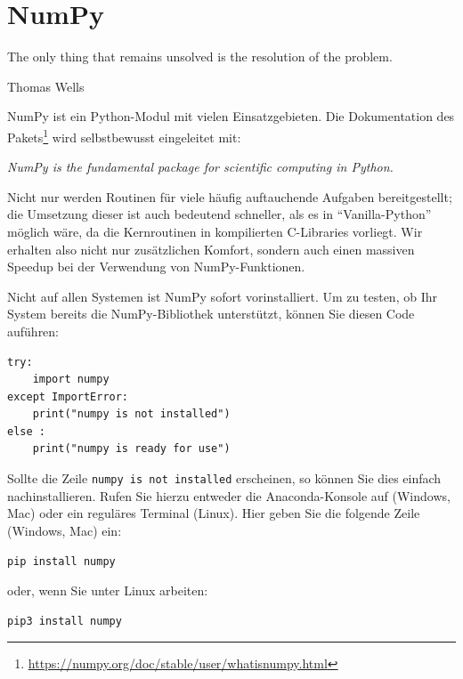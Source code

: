 \chapter{NumPy}
\label{chp:Numpy}
\epigraph{
	The only thing that remains unsolved is the resolution of the problem.
}{Thomas Wells}

NumPy ist ein Python-Modul mit vielen Einsatzgebieten. Die Dokumentation des Pakets\footnote{\url{https://numpy.org/doc/stable/user/whatisnumpy.html}} wird selbstbewusst eingeleitet mit:
\begin{center}
	\emph{NumPy is the fundamental package for scientific computing in Python.}
\end{center}

Nicht nur werden Routinen für viele häufig auftauchende Aufgaben bereitgestellt; die Umsetzung dieser ist auch bedeutend schneller, als es in \enquote{Vanilla-Python} möglich wäre, da die Kernroutinen in kompilierten C-Libraries vorliegt. Wir erhalten also nicht nur zusätzlichen Komfort, sondern auch einen massiven Speedup bei der Verwendung von NumPy-Funktionen.

\begin{hintbox}[Installation]
Nicht auf allen Systemen ist NumPy sofort vorinstalliert. Um zu testen, ob Ihr System bereits die NumPy-Bibliothek unterstützt, können Sie diesen Code auführen:
\begin{codebox}
\begin{verbatim}
try:
    import numpy
except ImportError:
    print("numpy is not installed")
else :
    print("numpy is ready for use")
\end{verbatim}
\end{codebox}

Sollte die Zeile \texttt{numpy is not installed} erscheinen, so können Sie dies einfach nachinstallieren. Rufen Sie hierzu entweder die Anaconda-Konsole auf (Windows, Mac) oder ein reguläres Terminal (Linux). Hier geben Sie die folgende Zeile (Windows, Mac) ein:

\begin{cmdbox}
\begin{verbatim}
pip install numpy
\end{verbatim}
\end{cmdbox}

oder, wenn Sie unter Linux arbeiten:
\begin{cmdbox}
\begin{verbatim}
pip3 install numpy
\end{verbatim}
\end{cmdbox}
\end{hintbox}

